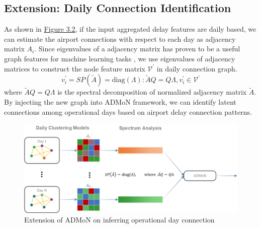 \subsection{Extension: Daily Connection Identification}
\label{ch_3_3_3}

As shown in \hyperref[fig:3-2]{Figure 3.2}, if the input aggregated delay features are daily based, we can estimate the airport connections with respect to each day as adjacency matrix $A_i$. Since eigenvalues of a adjacency matrix has proven to be a useful graph features for machine learning tasks \cite{schmidt2014spectral}, we use eigenvalues of adjacency matrices to construct the node feature matrix $\mathcal{V}^\prime$ in daily connection graph.
\begin{equation}
    v_i^\prime=SP(\tilde{A})=\text{diag}(\Lambda):\tilde{A}Q=Q\Lambda, v_i^\prime\in\mathcal{V}^\prime
\end{equation}
where $\tilde{A}Q=Q\Lambda$ is the spectral decomposition of normalized adjacency matrix $\tilde{A}$. By injecting the new graph into ADMoN framework, we can identify latent connections among operational days based on airport delay connection patterns.

\begin{figure}[thbp]
    \label{fig:3-2}
    \centering
    \includegraphics[width=\textwidth]{img/extension.png}
    \caption{Extension of ADMoN on inferring operational day connection}
\end{figure}








